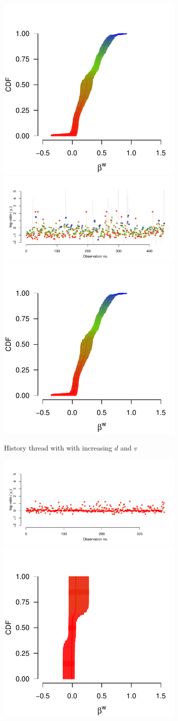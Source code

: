 \documentclass[9pt,twoside,lineno]{pnas-new}
\begin{document}
\begin{figure}
\begin{subfigure}{.44\linewidth}
		\includegraphics[width=.28\linewidth]{beta_history_1097_1_extra.pdf}
		\includegraphics[width=.7\linewidth]{thread_history_1097_1_extra.pdf}	
		\includegraphics[width=.28\linewidth]{beta_history_1097_1_extra.pdf}
		\caption{\footnotesize History thread with with increasing $d$ and $v$}
		\label{fig:supp hist}
	\end{subfigure}
	\begin{subfigure}{.44\linewidth}
		\includegraphics[width=.7\linewidth]{thread_max_55_1.pdf}
		\includegraphics[width=.28\linewidth]{beta_max_55_1.pdf}	

\end{subfigure}
\end{figure}
\end{document}

